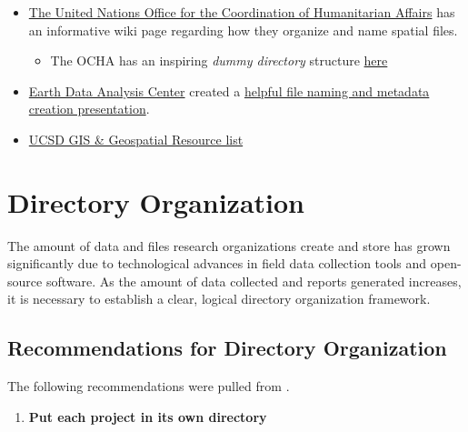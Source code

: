 \documentclass[
]{book}
\providecommand{\tightlist}{%
  \setlength{\itemsep}{0pt}\setlength{\parskip}{0pt}}
\begin{document}
\begin{itemize}
\tightlist
\item
  \href{https://sites.google.com/site/ochaimwiki/file-and-dataset-naming-manual/file-naming-convention}{The United Nations Office for the Coordination of Humanitarian Affairs} has an informative wiki page regarding how they organize and name spatial files.

  \begin{itemize}
  \tightlist
  \item
    The OCHA has an inspiring \emph{dummy directory} structure \href{https://sites.google.com/site/ochaimwiki/file-and-dataset-naming-manual/file-structure}{here}
  \end{itemize}
\item
  \href{https://edac.unm.edu/}{Earth Data Analysis Center} created a \href{https://slideplayer.com/slide/8981458/}{helpful file naming and metadata creation presentation}.
\item
  \href{https://ucsd.libguides.com/gis/data-source}{UCSD GIS \& Geospatial Resource list}
\end{itemize}

\hypertarget{directory-organization}{%
\section{Directory Organization}\label{directory-organization}}

The amount of data and files research organizations create and store has grown significantly due to technological advances in field data collection tools and open-source software. As the amount of data collected and reports generated increases, it is necessary to establish a clear, logical directory organization framework.

\hypertarget{recommendations-for-directory-organization}{%
\subsection{Recommendations for Directory Organization}\label{recommendations-for-directory-organization}}

The following recommendations were pulled from \citet{Spreckelsen_2020}.

\begin{enumerate}
\def\labelenumi{\arabic{enumi}.}
\tightlist
\item
  \textbf{Put each project in its own directory}
\end{enumerate}
\end{document}
